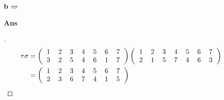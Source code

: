 \documentclass[paper=usletter, fontsize=12pt]{article}
\begin{document}
\begin{itemize}
\begin{itemize}
\begin{itemize}
                \item[\textbf{b}] $\tau\sigma$
                \item[\textbf{Ans}]
                \begin{proof}[\unskip\nopunct]
                    \begingroup
                    \addtolength{\jot}{1em}
                    \begin{align*}
                        \tau\sigma &= \left(
                            \begin{tabular}{ccccccc}
                                1 & 2 & 3 & 4 & 5 & 6 & 7 \\
                                3 & 2 & 5 & 4 & 6 & 1 & 7
                            \end{tabular}
                        \right)\left(
                            \begin{tabular}{ccccccc}
                                1 & 2 & 3 & 4 & 5 & 6 & 7 \\
                                2 & 1 & 5 & 7 & 4 & 6 & 3
                            \end{tabular}
                        \right) \\
                        &= \left(
                            \begin{tabular}{ccccccc}
                                1 & 2 & 3 & 4 & 5 & 6 & 7 \\
                                2 & 3 & 6 & 7 & 4 & 1 & 5
                            \end{tabular}
                        \right) \qedhere
                    \end{align*}
                    \endgroup
                \end{proof}
                \vspace{0.2in}


\end{itemize}
\end{itemize}
\end{itemize}
\end{document}
